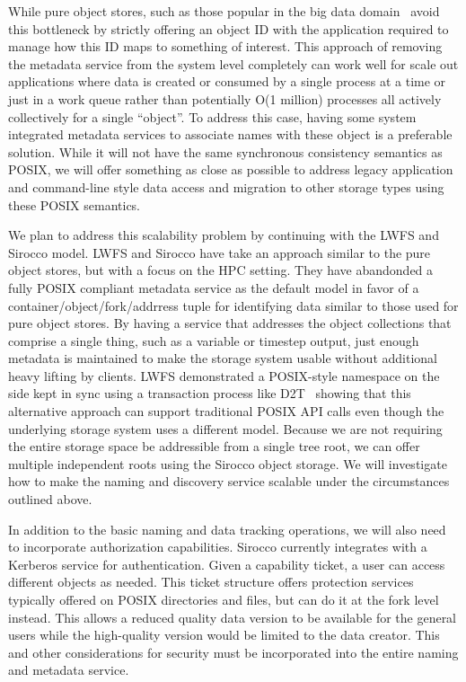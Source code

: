 While pure object stores, such as those popular in the big data
domain~\cite{memcached,others} avoid this bottleneck by strictly offering an
object ID with the application required to manage how this ID maps to something
of interest. This approach of removing the metadata service from the system
level completely can work well for scale out applications where data is created
or consumed by a single process at a time or just in a work queue rather than
potentially O(1 million) processes all actively collectively for a single
``object''. To address this case, having some system integrated metadata
services to associate names with these object is a preferable solution. While
it will not have the same synchronous consistency semantics as POSIX, we will
offer something as close as possible to address legacy application and
command-line style data access and migration to other storage types using these
POSIX semantics.

We plan to address this scalability problem by continuing with the LWFS and
Sirocco model. LWFS and Sirocco have take an approach similar to the pure
object stores, but with a focus on the HPC setting. They have abandonded a
fully POSIX compliant metadata service as the default model in favor of a
container/object/fork/addrress tuple for identifying data similar to those used
for pure object stores. By having a service that addresses the object
collections that comprise a single thing, such as a variable or timestep
output, just enough metadata is maintained to make the storage system usable
without additional heavy lifting by clients.  LWFS demonstrated a POSIX-style
namespace on the side kept in sync using a transaction process like
D2T~\cite{lofstead:2012:txn} showing that this alternative approach can support traditional
POSIX API calls even though the underlying storage system uses a different
model. Because we are not requiring the entire storage space be addressible
from a single tree root, we can offer multiple independent roots using the
Sirocco object storage. We will investigate how to make the naming and
discovery service scalable under the circumstances outlined above.

In addition to the basic naming and data tracking operations, we will also need
to incorporate authorization capabilities. Sirocco currently integrates with a
Kerberos service for authentication. Given a capability ticket, a user can
access different objects as needed. This ticket structure offers protection
services typically offered on POSIX directories and files, but can do it at the
fork level instead. This allows a reduced quality data version to be available
for the general users while the high-quality version would be limited to the
data creator. This and other considerations for security must be incorporated
into the entire naming and metadata service.

